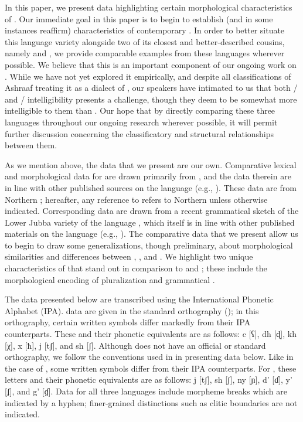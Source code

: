 \documentclass[output=paper,modfonts,nonflat,
colorlinks, citecolor=brown,
draftmode
]{langsci/langscibook}
\begin{document}
 In this paper, we present data highlighting certain morphological characteristics of . Our immediate goal in this paper is to begin to establish (and in some instances reaffirm) characteristics of contemporary . In order to better situate this language variety alongside two of its closest and better-described cousins, namely  and , we provide comparable examples from these languages wherever possible. We believe that this is an important component of our ongoing work on . While we have not yet explored it empirically, and despite all classifications of Ashraaf treating it as a dialect of , our  speakers have intimated to us that both / and / intelligibility presents a challenge, though they deem  to be somewhat more intelligible to them than . Our hope that by directly comparing these three languages throughout our ongoing research wherever possible, it will permit further discussion concerning the classificatory and structural relationships between them. 
 
 As we mention above, the  data that we present are our own. Comparative lexical and morphological data for  are drawn primarily from \citet{Greenetal2015}, and the data therein are in line with other published sources on the language (e.g., \citealt{Bell1953,Saeed1999}). These data are from Northern ; hereafter, any reference to  refers to Northern  unless otherwise indicated. Corresponding  data are drawn from a recent grammatical sketch of the Lower Jubba variety of the language \citet{PasterRanero2015}, which itself is in line with other published materials on the language (e.g., \citealt{Paster2007,Paster2010,PasterMaayGender}). The comparative data that we present allow us to begin to draw some generalizations, though preliminary, about morphological similarities and differences between , , and . We highlight two unique characteristics of  that stand out in comparison to  and ; these include the morphological encoding of pluralization and grammatical . 
 
 The  data presented below are transcribed using the International Phonetic Alphabet (IPA).  data are given in the standard  orthography (\citealt{Andrzejewski1978}); in this orthography, certain written symbols differ markedly from their IPA counterparts. These and their phonetic equivalents are as follows: c [ʕ], dh [ɖ], kh [χ], x [ħ], j [tʃ], and sh [ʃ]. Although  does not have an official or standard orthography, we follow the conventions used in \citet{PasterRanero2015} in presenting
 data below. Like in the case of , some  written symbols differ from their IPA counterparts. For , these letters and their phonetic equivalents are as follows: j [tʃ], sh [ʃ], ny [ɲ], d' [ɗ], y' [ʄ], and g' [ɠ]. Data for all three languages include morpheme breaks which are indicated by a hyphen; finer-grained distinctions such as clitic boundaries are not indicated. 
 
\end{document}
